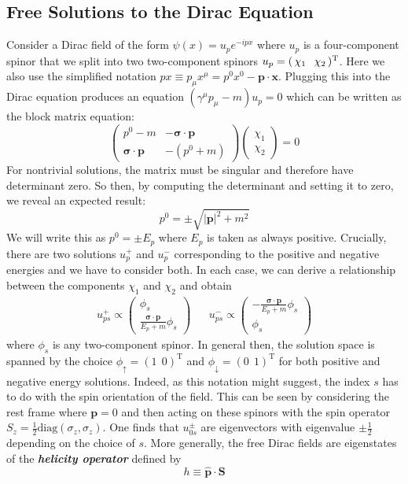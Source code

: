 \documentclass[onecolumn]{gwclass}
\def \*#1{\boldsymbol{#1}}
\renewcommand{\t}[1]{\text{#1}}
\begin{document}
\subsection{Free Solutions to the Dirac Equation}
Consider a Dirac field of the form $\psi(x) = u_pe^{-ipx}$ where $u_p$ is a four-component spinor that we split into two two-component spinors $u_p=(\,\chi_1\hspace{0.1in}\chi_2\,)^\t{T}$. Here we also use the simplified notation $px \equiv p_\mu x^\mu = p^0x^0 - \*p\cdot\*x$. Plugging this into the Dirac equation produces an equation $ (\gamma^\mu p_\mu - m)u_p=0 $ which can be written as the block matrix equation:
$$ 
\begin{pmatrix}
		p^0 - m & - \*\sigma\cdot \*p \\
		\*\sigma\cdot\*p &  -(p^0 + m)
\end{pmatrix}\begin{pmatrix}
\chi_1\\
\chi_2
\end{pmatrix} = 0 $$
For nontrivial solutions, the matrix must be singular and therefore have determinant zero. So then, by computing the determinant and setting it to zero, we reveal an expected result:
$$ p^0 = \pm \sqrt{|\*p|^2 + m^2} $$
We will write this as $p^0=\pm E_p$ where $E_p$ is taken as always positive. Crucially, there are two solutions  $u_p^+$ and $u_p^-$ corresponding to the positive and negative energies and we have to consider both. In each case, we can derive a relationship between the components $\chi_1$ and $\chi_2$ and obtain
\begin{align*}
	u^+_{ps} \propto \begin{pmatrix}
		\phi_s \\
		\frac{\*\sigma\cdot\*p}{E_p+m}\phi_s
	\end{pmatrix}
	&&
	u^-_{ps} \propto \begin{pmatrix}
		-\frac{\*\sigma\cdot\*p}{E_p+m}\phi_s\\
		\phi_s
	\end{pmatrix}
\end{align*}
where $\phi_s$ is any two-component spinor. In general then, the solution space is spanned by the choice $\phi_\uparrow = (1\:\:0)^\t{T}$ and $\phi_\downarrow = (0\:\:1)^\t{T}$ for both positive and negative energy solutions. Indeed, as this notation might suggest, the index $s$ has to do with the spin orientation of the field. This can be seen by considering the rest frame where $\*p=0$ and then acting on these spinors with the spin operator $S_z=\frac{1}{2}\t{diag}(\sigma_z, \sigma_z)$. One finds that $u^\pm_{0s}$ are eigenvectors with eigenvalue $\pm\frac{1}{2}$ depending on the choice of $s$. More generally, the free Dirac fields are eigenstates of the \textbf{\emph{helicity operator}} defined by
$$ h \equiv \hat{\*p}\cdot\*S $$
\end{document}
